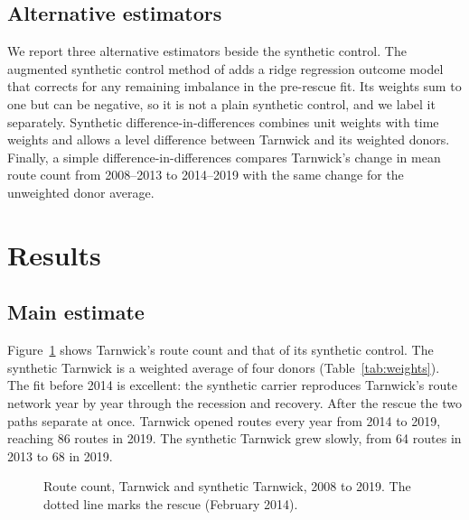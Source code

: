 \documentclass[12pt]{article}
\begin{document}
\subsection{Alternative estimators}

We report three alternative estimators beside the synthetic control. The augmented synthetic control method of \citet{benmichael2021} adds a ridge regression outcome model that corrects for any remaining imbalance in the pre-rescue fit. Its weights sum to one but can be negative, so it is not a plain synthetic control, and we label it separately. Synthetic difference-in-differences \citep{arkhangelsky2021} combines unit weights with time weights and allows a level difference between Tarnwick and its weighted donors. Finally, a simple difference-in-differences compares Tarnwick's change in mean route count from 2008--2013 to 2014--2019 with the same change for the unweighted donor average.

\section{Results}

\subsection{Main estimate}

Figure~\ref{fig:path} shows Tarnwick's route count and that of its synthetic control. The synthetic Tarnwick is a weighted average of four donors (Table~\ref{tab:weights}). The fit before 2014 is excellent: the synthetic carrier reproduces Tarnwick's route network year by year through the recession and recovery. After the rescue the two paths separate at once. Tarnwick opened routes every year from 2014 to 2019, reaching 86 routes in 2019. The synthetic Tarnwick grew slowly, from 64 routes in 2013 to 68 in 2019.

\begin{figure}[ht]
\centering
{}
\caption{Route count, Tarnwick and synthetic Tarnwick, 2008 to 2019. The dotted line marks the rescue (February 2014).}
\label{fig:path}
\end{figure}
\end{document}
